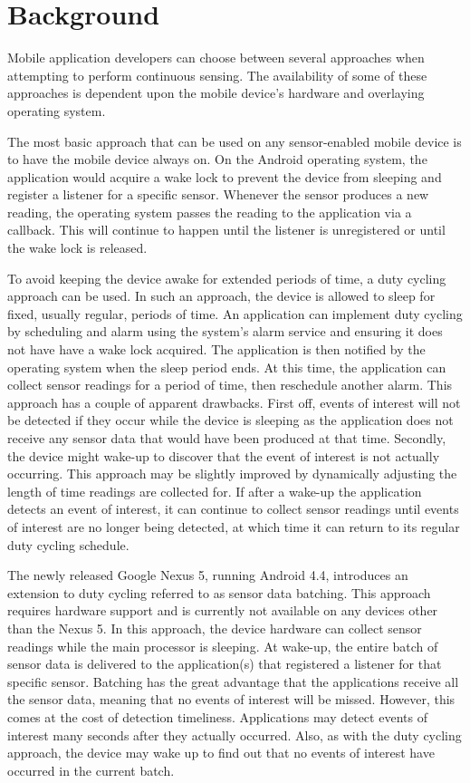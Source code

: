 
\section{Background}
\label{sec:background}

Mobile application developers can choose between several approaches when attempting to perform continuous sensing. The availability of some of these approaches is dependent upon the mobile device's hardware and overlaying operating system. 

The most basic approach that can be used on any sensor-enabled mobile device is to have the mobile device always on. On the Android operating system, the application would acquire a wake lock to prevent the device from sleeping and register a listener for a specific sensor. Whenever the sensor produces a new reading, the operating system passes the reading to the application via a callback. This will continue to happen until the listener is unregistered or until the wake lock is released.

To avoid keeping the device awake for extended periods of time, a duty cycling approach can be used. In such an approach, the device is allowed to sleep for fixed, usually regular, periods of time. An application can implement duty cycling by scheduling and alarm using the system's alarm service and ensuring it does not have have a wake lock acquired. The application is then notified by the operating system when the sleep period ends. At this time, the application can collect sensor readings for a period of time, then reschedule another alarm. This approach has a couple of apparent drawbacks. First off, events of interest will not be detected if they occur while the device is sleeping as the application does not receive any sensor data that would have been produced at that time. Secondly, the device might wake-up to discover that the event of interest is not actually occurring. This approach may be slightly improved by dynamically adjusting the length of time readings are collected for. If after a wake-up the application detects an event of interest, it can continue to collect sensor readings until events of interest are no longer being detected, at which time it can return to its regular duty cycling schedule.

The newly released Google Nexus 5, running Android 4.4, introduces an extension to duty cycling referred to as sensor data batching. This approach requires hardware support and is currently not available on any devices other than the Nexus 5. In this approach, the device hardware can collect sensor readings while the main processor is sleeping. At wake-up, the entire batch of sensor data is delivered to the application(s) that registered a listener for that specific sensor. Batching has the great advantage that the applications receive all the sensor data, meaning that no events of interest will be missed. However, this comes at the cost of detection timeliness. Applications may detect events of interest many seconds after they actually occurred. Also, as with the duty cycling approach, the device may wake up to find out that no events of interest have occurred in the current batch.

